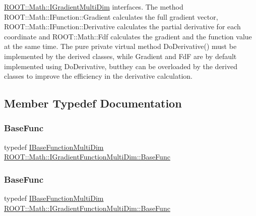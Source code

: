 \mbox{\hyperlink{classROOT_1_1Math_1_1IGradientMultiDim}{R\+O\+O\+T\+::\+Math\+::\+I\+Gradient\+Multi\+Dim}} interfaces. The method R\+O\+O\+T\+::\+Math\+::\+I\+Function\+::\+Gradient calculates the full gradient vector, R\+O\+O\+T\+::\+Math\+::\+I\+Function\+::\+Derivative calculates the partial derivative for each coordinate and R\+O\+O\+T\+::\+Math\+::\+Fdf calculates the gradient and the function value at the same time. The pure private virtual method Do\+Derivative() must be implemented by the derived classes, while Gradient and FdF are by default implemented using Do\+Derivative, butthey can be overloaded by the derived classes to improve the efficiency in the derivative calculation. 

\subsection{Member Typedef Documentation}
\mbox{\label{classROOT_1_1Math_1_1IGradientFunctionMultiDim_a803074495bafb5acf9f130b648001609}} 
\subsubsection{\texorpdfstring{BaseFunc}{BaseFunc}\hspace{0.1cm}{\footnotesize\ttfamily [1/2]}}
{\footnotesize\ttfamily typedef \mbox{\hyperlink{classROOT_1_1Math_1_1IBaseFunctionMultiDim}{I\+Base\+Function\+Multi\+Dim}} \mbox{\hyperlink{classROOT_1_1Math_1_1IGradientFunctionMultiDim_a803074495bafb5acf9f130b648001609}{R\+O\+O\+T\+::\+Math\+::\+I\+Gradient\+Function\+Multi\+Dim\+::\+Base\+Func}}}

\mbox{\label{classROOT_1_1Math_1_1IGradientFunctionMultiDim_a803074495bafb5acf9f130b648001609}} 
\subsubsection{\texorpdfstring{BaseFunc}{BaseFunc}\hspace{0.1cm}{\footnotesize\ttfamily [2/2]}}
{\footnotesize\ttfamily typedef \mbox{\hyperlink{classROOT_1_1Math_1_1IBaseFunctionMultiDim}{I\+Base\+Function\+Multi\+Dim}} \mbox{\hyperlink{classROOT_1_1Math_1_1IGradientFunctionMultiDim_a803074495bafb5acf9f130b648001609}{R\+O\+O\+T\+::\+Math\+::\+I\+Gradient\+Function\+Multi\+Dim\+::\+Base\+Func}}}

